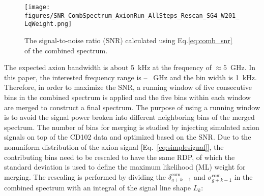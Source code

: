 \begin{figure}[hbt!]
    \centering
    \texttt{[image: figures/SNR\_CombSpectrum\_AxionRun\_AllSteps\_Rescan\_SG4\_W201\_LqWeight.png]}
    \caption{The signal-to-noise ratio (SNR) calculated using 
Eq.\eqref{eq:comb_snr} of the combined spectrum. }
    \label{fig:SNR_comb}
\end{figure}




The expected axion bandwidth is about 5~kHz at the frequency of 
$\approx5$~GHz. 
In this paper, the interested frequency range is \flo -- \fhi~GHz and the bin 
width is 1~kHz. Therefore, in order to maximize the SNR, a running window of 
five consecutive bins in the combined spectrum is applied and the five bins 
within each window are merged to construct a final spectrum.  
The purpose of using a running window is to avoid the signal power broken 
into different neighboring bins of the merged spectrum. 
The number of bins for merging is studied by injecting 
simulated axion signals on top of the CD102 data and optimized based 
on the SNR. 
Due to the nonuniform distribution of the axion signal 
[Eq.~\eqref{eq:simplesignal}],
the contributing bins need to be rescaled to have the same RDP, of which the 
standard deviation is used to define the maximum likelihood (ML)
weight for merging. The rescaling is performed by dividing the 
$\delta^\text{com}_{g+k-1}$ and $\sigma^\text{com}_{g+k-1}$ in the combined 
spectrum with an integral of the signal line shape $L_{k}$:

